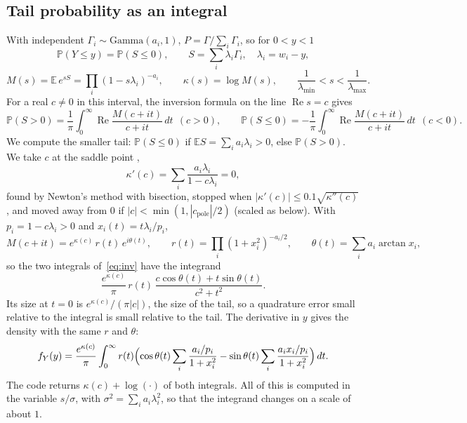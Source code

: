 \documentclass[11pt]{article}
\newcommand{\Pp}{\mathbb{P}}
\newcommand{\Ee}{\mathbb{E}}
\begin{document}
\subsection{Tail probability as an integral}

With independent $\Gamma_i \sim \mathrm{Gamma}(a_i, 1)$, $P = \Gamma/\sum_i \Gamma_i$, so for $0 < y < 1$
\[
  \Pp(Y \le y) = \Pp(S \le 0), \qquad S = \sum_i \lambda_i \Gamma_i, \quad \lambda_i = w_i - y,
\]
\[
  M(s) = \Ee\, e^{sS} = \prod_i (1 - s\lambda_i)^{-a_i}, \qquad \kappa(s) = \log M(s), \qquad \frac{1}{\lambda_{\min}} < s < \frac{1}{\lambda_{\max}} .
\]
For a real $c \neq 0$ in this interval, the inversion formula on the line $\operatorname{Re} s = c$ gives \cite{gilpelaez1951}
\begin{equation}\label{eq:inv}
  \Pp(S > 0) = \frac1\pi \int_0^\infty \operatorname{Re}\frac{M(c+it)}{c+it}\,dt \ \ (c > 0), \qquad
  \Pp(S \le 0) = -\frac1\pi \int_0^\infty \operatorname{Re}\frac{M(c+it)}{c+it}\,dt \ \ (c < 0).
\end{equation}
We compute the smaller tail: $\Pp(S \le 0)$ if $\Ee S = \sum_i a_i\lambda_i > 0$, else $\Pp(S > 0)$.
We take $c$ at the saddle point \cite{daniels1954,helstrom1978},
\[
  \kappa'(c) = \sum_i \frac{a_i \lambda_i}{1 - c\lambda_i} = 0,
\]
found by Newton's method with bisection, stopped when $|\kappa'(c)| \le 0.1\sqrt{\kappa''(c)}$, and moved away from $0$ if $|c| < \min(1, |c_{\mathrm{pole}}|/2)$ (scaled as below).
With $p_i = 1 - c\lambda_i > 0$ and $x_i(t) = t\lambda_i/p_i$,
\[
  M(c + it) = e^{\kappa(c)}\, r(t)\, e^{i\theta(t)}, \qquad
  r(t) = \prod_i (1 + x_i^2)^{-a_i/2}, \qquad \theta(t) = \sum_i a_i \arctan x_i ,
\]
so the two integrals of~\eqref{eq:inv} have the integrand
\begin{equation}\label{eq:tail}
  \frac{e^{\kappa(c)}}{\pi}\, r(t)\, \frac{c\cos\theta(t) + t\sin\theta(t)}{c^2 + t^2} .
\end{equation}
Its size at $t = 0$ is $e^{\kappa(c)}/(\pi|c|)$, the size of the tail, so a quadrature error small relative to the integral is small relative to the tail.
The derivative in $y$ gives the density with the same $r$ and $\theta$:
\begin{equation}\label{eq:pdf}
  f_Y(y) = \frac{e^{\kappa(c)}}{\pi} \int_0^\infty r(t) \Bigl(\cos\theta(t) \sum_i \frac{a_i/p_i}{1 + x_i^2} - \sin\theta(t) \sum_i \frac{a_i x_i/p_i}{1 + x_i^2}\Bigr)\,dt .
\end{equation}
The code returns $\kappa(c) + \log(\cdot)$ of both integrals.
All of this is computed in the variable $s/\sigma$, with $\sigma^2 = \sum_i a_i\lambda_i^2$, so that the integrand changes on a scale of about $1$.
\end{document}
